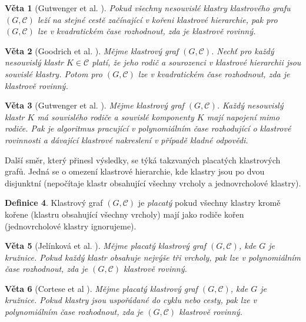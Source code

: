 \documentclass[12pt,a4report]{report}
\newtheorem{theorem}{Věta}[chapter]
\theoremstyle{definition}
\newtheorem{defn}[theorem]{Definice}
\begin{document}
\begin{theorem}[Gutwenger et al. \cite{GutwengerEtAl02}]
Pokud všechny nesouvislé klastry klastrového grafu $(G, \mathcal C)$ leží na stejné cestě začínající v kořeni klastrové hierarchie, pak pro $(G, \mathcal C)$ lze v kvadratickém čase rozhodnout, zda je klastrově rovinný.
\end{theorem}

\begin{theorem}[Goodrich et al. \cite{GoodrichEtAl05}]
Mějme klastrový graf $(G, \mathcal C)$. Nechť pro každý nesouvislý klastr $K \in \mathcal C$ platí, že jeho rodič a sourozenci v klastrové hierarchii jsou souvislé klastry. Potom pro $(G, \mathcal C)$ lze v kvadratickém čase rozhodnout, zda je klastrově rovinný.
\end{theorem}

\begin{theorem}[Gutwenger et al. \cite{GutwengerEtAl02}]
Mějme klastrový graf $(G, \mathcal C)$. Každý nesouvislý klastr $K$ má souvislého rodiče a souvislé komponenty $K$ mají napojení mimo rodiče. Pak je algoritmus pracující v polynomiálním čase rozhodující o klastrové rovinnosti a dávající klastrové nakreslení v případě kladné odpovědi.
\end{theorem}

Další směr, který přinesl výsledky, se týká takzvaných placatých klastrových grafů. Jedná se o omezení klastrové hierarchie, kde klastry jsou po dvou disjunktní (nepočítaje klastr obsahující všechny vrcholy a jednovrcholové klastry).

\begin{defn}
Klastrový graf $(G, \mathcal C)$ je \textit{placatý} pokud všechny klastry kromě kořene (klastru obsahující všechny vrcholy) mají jako rodiče kořen (jednovrcholové klastry ignorujeme).
\end{defn}

\begin{theorem}[Jelínková et al. \cite{JelinkovaEtAl07}]
Mějme placatý klastrový graf  $(G, \mathcal C)$, kde $G$ je kružnice. Pokud každý klastr obsahuje nejvýše tři vrcholy, pak lze v polynomiálním čase rozhodnout, zda je  $(G, \mathcal C)$ klastrově rovinný.
\end{theorem}

\begin{theorem}[Cortese et al \cite{CorteseEtAl04}]
Mějme placatý klastrový graf  $(G, \mathcal C)$, kde $G$ je kružnice. Pokud klastry jsou uspořádané do cyklu nebo cesty, pak lze v polynomiálním čase rozhodnout, zda je  $(G, \mathcal C)$ klastrově rovinný.
\end{theorem}
\end{document}
